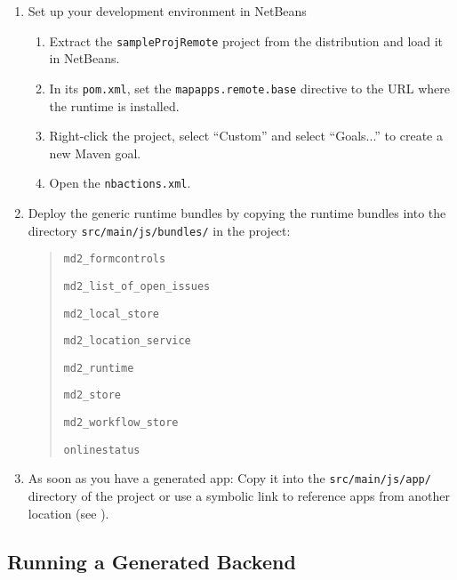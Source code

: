 \begin{enumerate}
\item {Set up your \mapapps  development environment in NetBeans}

\begin{enumerate}
\item Extract the \lstinline|sampleProjRemote| project from the \mapapps distribution and load it in NetBeans. \label{item:extraction}
\item In its \lstinline|pom.xml|,
 set the \lstinline|mapapps.remote.base| directive to the URL where the \mapapps runtime is installed.
\item Right-click the project, select \enquote{Custom} and select \enquote{Goals...} to create a new Maven goal. 
\item Open the \lstinline|nbactions.xml|. 

\end{enumerate}

\item Deploy the generic \MD runtime bundles by copying the \MD runtime bundles into the directory \lstinline[language=Simple]|src/main/js/bundles/| in the project:
	\begin{quotation}
		 \lstinline|md2_formcontrols|
		 
		 \lstinline|md2_list_of_open_issues|
		 
		 \lstinline|md2_local_store|
		 
		 \lstinline|md2_location_service|
		 
		 \lstinline|md2_runtime|
		 		 
		 \lstinline|md2_store|
		 
		 \lstinline|md2_workflow_store|
		 
		 \lstinline|onlinestatus|
	\end{quotation}

\item As soon as you have a generated \mapapps app: Copy it into the \lstinline[language=Simple]|src/main/js/app/| directory of the project or use a symbolic link to reference apps from another location (see ).


\end{enumerate}

\subsection{Running a Generated Backend}

